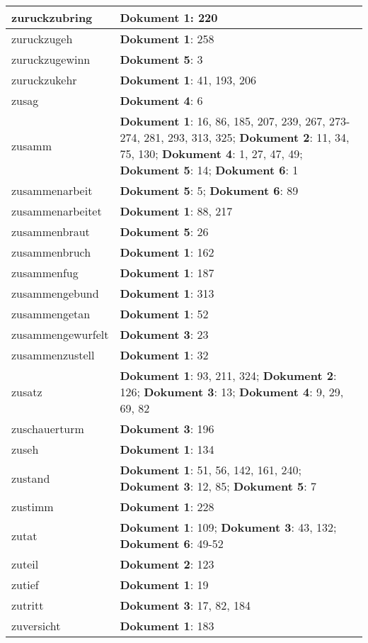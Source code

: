 \documentclass[a5paper]{article}
\begin{document}
\begin{longtable}[l]{|l|p{3in}|}
zuruckzubring & \textbf{Dokument 1}: 220 \\
\hline
zuruckzugeh & \textbf{Dokument 1}: 258 \\
\hline
zuruckzugewinn & \textbf{Dokument 5}: 3 \\
\hline
zuruckzukehr & \textbf{Dokument 1}: 41, 193, 206 \\
\hline
zusag & \textbf{Dokument 4}: 6 \\
\hline
zusamm & \textbf{Dokument 1}: 16, 86, 185, 207, 239, 267, 273-274, 281, 293, 313, 325; \textbf{Dokument 2}: 11, 34, 75, 130; \textbf{Dokument 4}: 1, 27, 47, 49; \textbf{Dokument 5}: 14; \textbf{Dokument 6}: 1 \\
\hline
zusammenarbeit & \textbf{Dokument 5}: 5; \textbf{Dokument 6}: 89 \\
\hline
zusammenarbeitet & \textbf{Dokument 1}: 88, 217 \\
\hline
zusammenbraut & \textbf{Dokument 5}: 26 \\
\hline
zusammenbruch & \textbf{Dokument 1}: 162 \\
\hline
zusammenfug & \textbf{Dokument 1}: 187 \\
\hline
zusammengebund & \textbf{Dokument 1}: 313 \\
\hline
zusammengetan & \textbf{Dokument 1}: 52 \\
\hline
zusammengewurfelt & \textbf{Dokument 3}: 23 \\
\hline
zusammenzustell & \textbf{Dokument 1}: 32 \\
\hline
zusatz & \textbf{Dokument 1}: 93, 211, 324; \textbf{Dokument 2}: 126; \textbf{Dokument 3}: 13; \textbf{Dokument 4}: 9, 29, 69, 82 \\
\hline
zuschauerturm & \textbf{Dokument 3}: 196 \\
\hline
zuseh & \textbf{Dokument 1}: 134 \\
\hline
zustand & \textbf{Dokument 1}: 51, 56, 142, 161, 240; \textbf{Dokument 3}: 12, 85; \textbf{Dokument 5}: 7 \\
\hline
zustimm & \textbf{Dokument 1}: 228 \\
\hline
zutat & \textbf{Dokument 1}: 109; \textbf{Dokument 3}: 43, 132; \textbf{Dokument 6}: 49-52 \\
\hline
zuteil & \textbf{Dokument 2}: 123 \\
\hline
zutief & \textbf{Dokument 1}: 19 \\
\hline
zutritt & \textbf{Dokument 3}: 17, 82, 184 \\
\hline
zuversicht & \textbf{Dokument 1}: 183 \\

\end{longtable}
\end{document}
